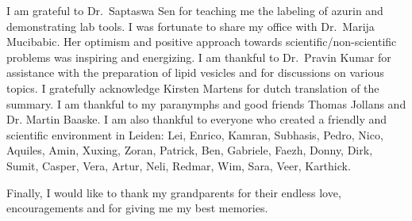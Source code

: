 I am grateful to Dr.~Saptaswa Sen for teaching me the labeling of azurin and demonstrating lab tools.
I was fortunate to share my office with Dr.~Marija Mucibabic. Her optimism and positive approach towards scientific/non-scientific problems was inspiring and energizing.
I am thankful to Dr.~Pravin Kumar for assistance with the preparation of lipid vesicles and for discussions on various topics.
I gratefully acknowledge Kirsten Martens for dutch translation of the summary.
I am thankful to my paranymphs and good friends Thomas Jollans and Dr. Martin Baaske.
I am also thankful to everyone who created a friendly and scientific environment in Leiden: Lei, Enrico, Kamran, Subhasis, Pedro, Nico, Aquiles, Amin, Xuxing, Zoran, Patrick, Ben, Gabriele, Faezh, Donny, Dirk, Sumit, Casper, Vera, Artur, Neli, Redmar, Wim, Sara, Veer, Karthick.

Finally, I would like to thank my grandparents for their endless love, encouragements and for giving me my best memories.